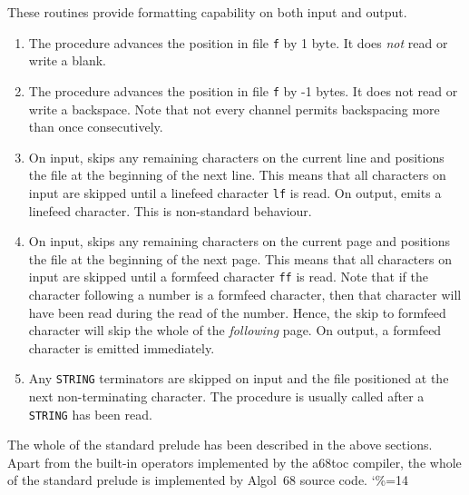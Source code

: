 These routines provide formatting capability on both input and output.
\begin{enumerate}
\item {}\newline
The procedure advances the position in file \verb|f| by 1 byte. It does
\emph{not} read or write a blank.
\item {}\newline
The procedure advances the position in file \verb|f| by -1 bytes. It
does not read or write a backspace. Note that not every channel
permits backspacing more than once consecutively.
\item {}\newline
On input, skips any remaining characters on the current line and
positions the file at the beginning of the next line. This means that
all characters on input are skipped until a linefeed character
\verb|lf| is read. On output, emits a linefeed character. This is
non-standard behaviour.
\item {}\newline
On input, skips any remaining characters on the current page and
positions the file at the beginning of the next page. This means that
all characters on input are skipped until a formfeed character
\verb|ff| is read. Note that if the character following a number is a
formfeed character, then that character will have been read during the
read of the number. Hence, the skip to formfeed character will skip the
whole of the \emph{following} page. On output, a formfeed character is
emitted immediately.
\item {}
\newline
Any \verb|STRING| terminators are skipped on input
and the file positioned at the next non-terminating character. The
procedure is usually called after a \verb|STRING| has been read.
\end{enumerate}

The whole of the standard prelude has been described in the above
sections. Apart from the built-in operators implemented by the a68toc
compiler, the whole of the standard prelude is implemented by
Algol~68 source code.
\catcode`\%=14
\vfill\eject
